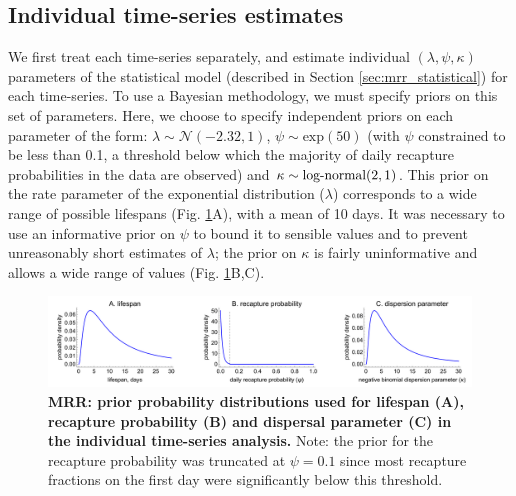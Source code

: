 \documentclass[12pt]{article}
\begin{document}
\subsection{Individual time-series estimates}\label{sec:MRR_individual_analysis}
We first treat each time-series separately, and estimate individual $(\lambda,\psi,\kappa)$ parameters of the statistical model (described in Section \ref{sec:mrr_statistical}) for each time-series. To use a Bayesian methodology, we must specify priors on this set of parameters. Here, we choose to specify independent priors on each parameter of the form: $\lambda\sim \mathcal{N}(-2.32,1)$, $\psi\sim \text{exp}(50)$ (with $\psi$ constrained to be less than 0.1, a threshold below which the majority of daily recapture probabilities in the data are observed) and $\kappa\sim \textnormal{log-normal}(2,1)$. This prior on the rate parameter of the exponential distribution ($\lambda$) corresponds to a wide range of possible lifespans (Fig. \ref{fig:mrr_individualTimeSeries_priors}A), with a mean of 10 days. It was necessary to use an informative prior on $\psi$ to bound it to sensible values and to prevent unreasonably short estimates of $\lambda$; the prior on $\kappa$ is fairly uninformative and allows a wide range of values (Fig. \ref{fig:mrr_individualTimeSeries_priors}B,C). 


\begin{figure}[h]
	\centerline{\includegraphics[width=1.25\textwidth]{./Figure_files/mrr_individualTimeSeries_priors.pdf}}
	\caption{\textbf{MRR: prior probability distributions used for lifespan (A), recapture probability (B) and dispersal parameter (C) in the individual time-series analysis.} Note: the prior for the recapture probability was truncated at $\psi=0.1$ since most recapture fractions on the first day were significantly below this threshold.}
	\label{fig:mrr_individualTimeSeries_priors}
\end{figure}
\end{document}
